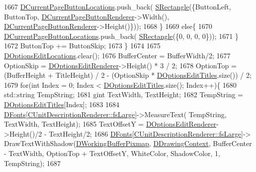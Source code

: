 \begin{DoxyCode}
1667             \hyperlink{classCApplicationData_a3615df8e23cea3ce17f11cf61340a7b4}{DCurrentPageButtonLocations}.push\_back( 
      \hyperlink{structSRectangle}{SRectangle}(\{ButtonLeft, ButtonTop, \hyperlink{classCApplicationData_abfe1743f2634b069ccc811db4a8733a8}{DCurrentPageButtonRenderer}->Width(),
       \hyperlink{classCApplicationData_abfe1743f2634b069ccc811db4a8733a8}{DCurrentPageButtonRenderer}->Height()\}));
1668         \}
1669         \textcolor{keywordflow}{else}\{
1670             \hyperlink{classCApplicationData_a3615df8e23cea3ce17f11cf61340a7b4}{DCurrentPageButtonLocations}.push\_back( 
      \hyperlink{structSRectangle}{SRectangle}(\{0, 0, 0, 0\}));
1671         \}
1672         ButtonTop += ButtonSkip;
1673     \}
1674     
1675     \hyperlink{classCApplicationData_ab4e6804c6e50cca45ab3c3071588da34}{DOptionsEditLocations}.clear();
1676     BufferCenter = BufferWidth/2;
1677     OptionSkip = \hyperlink{classCApplicationData_ad445b9a4d742414d09196de7cd8a5b26}{DOptionsEditRenderer}->Height() * 3 / 2;
1678     OptionTop = (BufferHeight + TitleHeight) / 2 - (OptionSkip * 
      \hyperlink{classCApplicationData_a7a322ef6b8c1db3e995c6b493230fd05}{DOptionsEditTitles}.size()) / 2;
1679     \textcolor{keywordflow}{for}(\textcolor{keywordtype}{int} Index = 0; Index < \hyperlink{classCApplicationData_a7a322ef6b8c1db3e995c6b493230fd05}{DOptionsEditTitles}.size(); Index++)\{
1680         std::string TempString;
1681         gint TextWidth, TextHeight;
1682         TempString = \hyperlink{classCApplicationData_a7a322ef6b8c1db3e995c6b493230fd05}{DOptionsEditTitles}[Index];
1683         
1684         \hyperlink{classCApplicationData_afde9247d0a3ea87393ec86dcdb1e8274}{DFonts}[\hyperlink{classCUnitDescriptionRenderer_a3ea4cd83b6dd9533ab3abb953a7da35aaf467097fe4f4811a5e2f1959c86e071d}{CUnitDescriptionRenderer::fsLarge}]->MeasureText(
      TempString, TextWidth, TextHeight);
1685         TextOffsetY = \hyperlink{classCApplicationData_ad445b9a4d742414d09196de7cd8a5b26}{DOptionsEditRenderer}->Height()/2 - TextHeight/2;
1686         \hyperlink{classCApplicationData_afde9247d0a3ea87393ec86dcdb1e8274}{DFonts}[\hyperlink{classCUnitDescriptionRenderer_a3ea4cd83b6dd9533ab3abb953a7da35aaf467097fe4f4811a5e2f1959c86e071d}{CUnitDescriptionRenderer::fsLarge}]->
      DrawTextWithShadow(\hyperlink{classCApplicationData_afa34cf2780f38dd28c0c811e69d60a97}{DWorkingBufferPixmap}, \hyperlink{classCApplicationData_aa6c5bea9bdcc64398e5a3f693661d37c}{DDrawingContext}, BufferCenter - TextWidth, 
      OptionTop + TextOffsetY, WhiteColor, ShadowColor, 1, TempString);
1687         

\end{DoxyCode}
